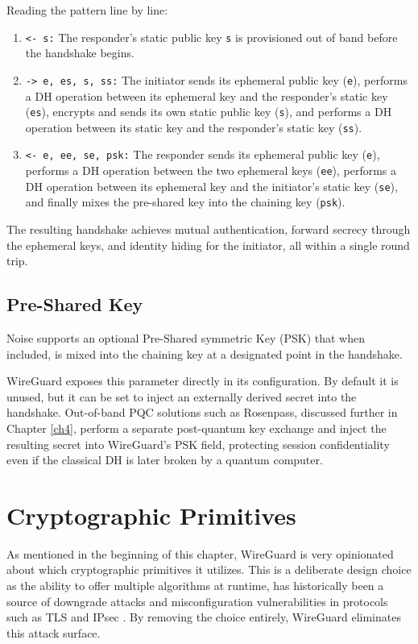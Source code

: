 Reading the pattern line by line:
\begin{enumerate}[start=0]
    \item \texttt{<- s:} The responder's static public key \texttt{s} is provisioned out of band before the handshake begins.
    \item \texttt{-> e, es, s, ss:} The initiator sends its ephemeral public key (\texttt{e}), performs a DH operation between its ephemeral key and the responder's static key (\texttt{es}), encrypts and sends its own static public key (\texttt{s}), and performs a DH operation between its static key and the responder's static key (\texttt{ss}).
    \item \texttt{<- e, ee, se, psk:} The responder sends its ephemeral public key (\texttt{e}), performs a DH operation between the two ephemeral keys (\texttt{ee}), performs a DH operation between its ephemeral key and the initiator's static key (\texttt{se}), and finally mixes the pre-shared key into the chaining key (\texttt{psk}).
\end{enumerate}

The resulting handshake achieves mutual authentication, forward secrecy through the ephemeral keys, and identity hiding for the initiator, all within a single round trip.

\subsection{Pre-Shared Key}\label{sec:psk}
Noise supports an optional Pre-Shared symmetric Key (PSK) that when included, is mixed into the chaining key at a designated point in the handshake.

WireGuard exposes this parameter directly in its configuration. By default it is unused, but it can be set to inject an externally derived secret into the handshake. Out-of-band PQC solutions such as Rosenpass, discussed further in Chapter \ref{ch4}, perform a separate post-quantum key exchange and inject the resulting secret into WireGuard's PSK field, protecting session confidentiality even if the classical DH is later broken by a quantum computer.

\section{Cryptographic Primitives}
As mentioned in the beginning of this chapter, WireGuard is very opinionated about which cryptographic primitives it utilizes. This is a deliberate design choice as the ability to offer multiple algorithms at runtime, has historically been a source of downgrade attacks and misconfiguration vulnerabilities in protocols such as TLS and IPsec \cite{Downgrade}. By removing the choice entirely, WireGuard eliminates this attack surface.

